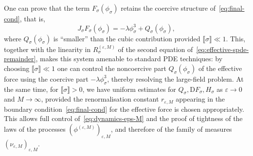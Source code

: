 \documentclass{article}
\numberwithin{equation}{section}
\newcommand{\mathD}{\mathrm{D}}
\theoremstyle{plain}
\theoremstyle{definition}
\begin{document}
One can prove that the term $F_{\sigma}  (\phi _{\sigma})$ retains the
coercive structure of~\eqref{eq:final-cond}, that is,
\[ J_{\sigma} F_{\sigma}  (\phi _{\sigma}) = - \lambda \phi_{\sigma}^3  + Q
   _{\sigma} (\phi _{\sigma}), \]
where $Q _{\sigma} (\phi _{\sigma})$ is ``smaller'' than the cubic
contribution provided $\llbracket \sigma \rrbracket \ll 1$. This, together with
the linearity in $R^{(\varepsilon, M)}_{\sigma}$ of the second equation
of~\eqref{eq:effective-spde-remainder}, makes this system amenable to standard
PDE techniques: by choosing $\llbracket \sigma \rrbracket \ll 1$ one can
control the noncoercive part $Q _{\sigma} (\phi _{\sigma})$ of the effective
force using the coercive part ${- \lambda \phi_{\sigma}^3} $, thereby
resolving the large-field problem. At the same time, for $\llbracket \sigma
\rrbracket > 0$, we have uniform estimates for $Q _{\sigma}, \mathD F
_{\sigma}, H _{\sigma}$ as $\varepsilon \rightarrow 0$ and $M \rightarrow
\infty$, provided the renormalisation constant $r_{\varepsilon, M}$ appearing
in the boundary condition~\eqref{eq:final-cond} for the effective force is
chosen appropriately. This allows full control of~\eqref{eq:dynamics-eps-M}
and the proof of tightness of the laws of the processes $(\phi^{(\varepsilon,
M)})_{\varepsilon, M}$, and therefore of the family of measures
$(\nu_{\varepsilon, M})_{\varepsilon, M}$.
\end{document}
